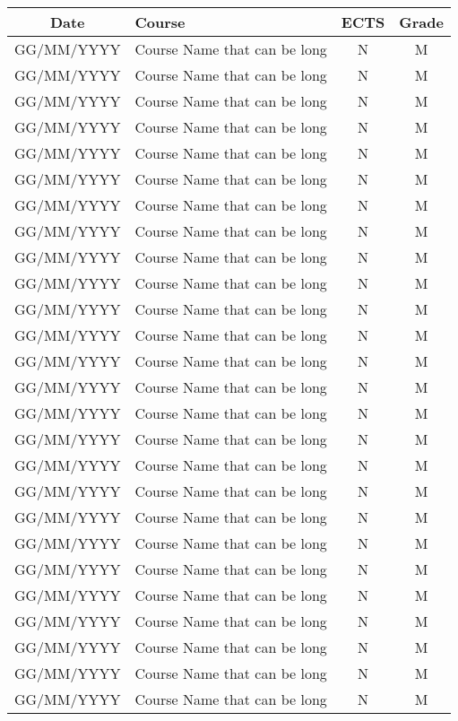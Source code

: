\clearpage

\begin{center}
\begin{onehalfspace}
\begin{tabular}{ c m{9.5cm} c c }
  \textbf{Date} & \textbf{Course} & \textbf{ECTS} & \textbf{Grade}\\\hline
  GG/MM/YYYY & Course Name that can be long & N & M \\\hline
  GG/MM/YYYY & Course Name that can be long & N & M \\\hline
  GG/MM/YYYY & Course Name that can be long & N & M \\\hline
  GG/MM/YYYY & Course Name that can be long & N & M \\\hline
  GG/MM/YYYY & Course Name that can be long & N & M \\\hline
  GG/MM/YYYY & Course Name that can be long & N & M \\\hline
  GG/MM/YYYY & Course Name that can be long & N & M \\\hline
  GG/MM/YYYY & Course Name that can be long & N & M \\\hline
  GG/MM/YYYY & Course Name that can be long & N & M \\\hline
  GG/MM/YYYY & Course Name that can be long & N & M \\\hline
  GG/MM/YYYY & Course Name that can be long & N & M \\\hline
  GG/MM/YYYY & Course Name that can be long & N & M \\\hline
  GG/MM/YYYY & Course Name that can be long & N & M \\\hline
  GG/MM/YYYY & Course Name that can be long & N & M \\\hline
  GG/MM/YYYY & Course Name that can be long & N & M \\\hline
  GG/MM/YYYY & Course Name that can be long & N & M \\\hline
  GG/MM/YYYY & Course Name that can be long & N & M \\\hline
  GG/MM/YYYY & Course Name that can be long & N & M \\\hline
  GG/MM/YYYY & Course Name that can be long & N & M \\\hline
  GG/MM/YYYY & Course Name that can be long & N & M \\\hline
  GG/MM/YYYY & Course Name that can be long & N & M \\\hline
  GG/MM/YYYY & Course Name that can be long & N & M \\\hline
  GG/MM/YYYY & Course Name that can be long & N & M \\\hline
  GG/MM/YYYY & Course Name that can be long & N & M \\\hline
  GG/MM/YYYY & Course Name that can be long & N & M \\\hline
  GG/MM/YYYY & Course Name that can be long & N & M
\end{tabular}
\end{onehalfspace}
\end{center}
